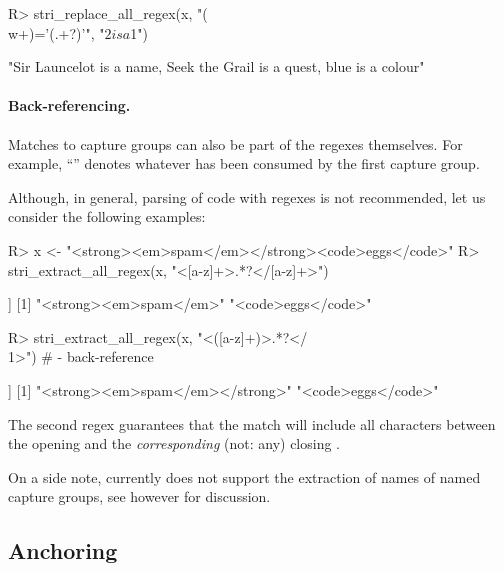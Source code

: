 \documentclass[nojss]{jss}
\begin{document}
\begin{Schunk}
\begin{Sinput}
R> stri_replace_all_regex(x, "(\\w+)='(.+?)'", "$2 is a $1")
\end{Sinput}
\begin{Soutput}
[1] "Sir Launcelot is a name, Seek the Grail is a quest, blue is a colour"
\end{Soutput}
\end{Schunk}

\paragraph{Back-referencing.}
Matches to capture groups can also be part of the regexes themselves.
For example, ``'' denotes whatever
has been consumed by the first capture group.

Although, in general, parsing of  code with regexes is
not recommended, let us consider the following examples:

\begin{Schunk}
\begin{Sinput}
R> x <- "<strong><em>spam</em></strong><code>eggs</code>"
R> stri_extract_all_regex(x, "<[a-z]+>.*?</[a-z]+>")
\end{Sinput}
\begin{Soutput}
[[1]]
[1] "<strong><em>spam</em>" "<code>eggs</code>"
\end{Soutput}
\begin{Sinput}
R> stri_extract_all_regex(x, "<([a-z]+)>.*?</\\1>")  # \1 - back-reference
\end{Sinput}
\begin{Soutput}
[[1]]
[1] "<strong><em>spam</em></strong>" "<code>eggs</code>"
\end{Soutput}
\end{Schunk}

The second regex guarantees that the match will  include all characters
between the opening  and the \textit{corresponding} (not: any)
closing .




\bigskip
On a side note, currently  does not support the extraction
of names of named capture groups, see however \citep{namedCapture}
for discussion.



\subsection{Anchoring}
\end{document}
